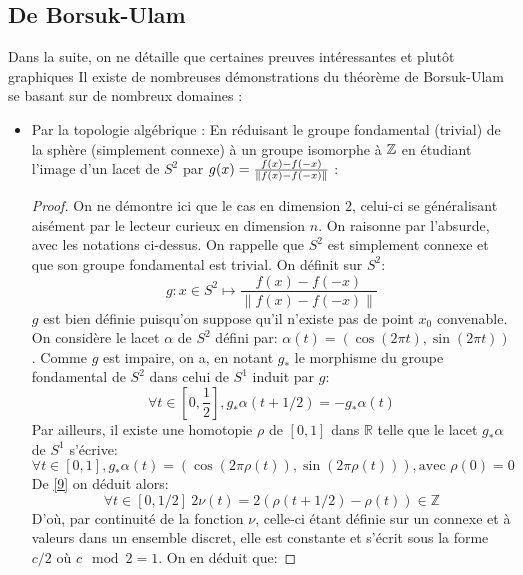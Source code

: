 \documentclass{cours}
\begin{document}
\subsection{De Borsuk-Ulam}
Dans la suite, on ne détaille que certaines preuves intéressantes et plutôt graphiques
Il existe de nombreuses démonstrations du théorème de Borsuk-Ulam se basant sur de nombreux domaines\! :
\begin{itemize}
    \item Par la topologie algébrique\! : En réduisant le groupe fondamental (trivial) de la sphère (simplement connexe) à un groupe isomorphe à $\mathbb{Z}$ en étudiant l'image d'un lacet de $S^{2}$ par $g(x) = \frac{f(x) - f(-x)}{\left\lVert f(x) - f(-x) \right\rVert}$\! :
          \begin{proof}
              On ne démontre ici que le cas en dimension $2$, celui-ci se généralisant aisément par le lecteur curieux en dimension $n$. On raisonne par l'absurde, avec les notations ci-dessus.
              On rappelle que $S^{2}$ est simplement connexe et que son groupe fondamental est trivial.
              On définit sur $S^{2}$:
              \[g: x \in S^{2} \mapsto \frac{f(x)-f(-x)}{\left\lVert f(x) - f(-x)\right\rVert}\]
              $g$ est bien définie puisqu'on suppose qu'il n'existe pas de point $x_{0}$ convenable. On considère le lacet $\alpha$ de $S^{2}$ défini par: $\alpha(t) = (\cos{(2\pi t)}, \sin{(2\pi t)})$.
              Comme $g$ est impaire, on a, en notant $g_{*}$ le morphisme du groupe fondamental de $S^{2}$ dans celui de $S^{1}$ induit par $g$:
              \begin{equation}
                  \label{9}
                  \forall t \in \left[0, \frac{1}{2}\right], g_{*}\alpha(t + 1/2) = -g_{*}\alpha(t)
              \end{equation}
              Par ailleurs, il existe une homotopie $\rho$ de $\left[0, 1\right]$ dans $\mathbb{R}$ telle que le lacet $g_{*}\alpha$ de $S^{1}$ s'écrive:
              \begin{equation*}
                  \forall t \in \left[0, 1\right], g_{*}\alpha(t) = (\cos{(2\pi \rho(t))}, \sin{(2\pi \rho(t))}), \text{avec } \rho(0) = 0
              \end{equation*}
              De \eqref{9} on déduit alors:
              \begin{equation*}
                  \forall t \in \left[0, 1/2\right] \ 2\nu(t) = 2(\rho(t + 1/2) - \rho(t)) \in \mathbb{Z}
              \end{equation*}
              D'où, par continuité de la fonction $\nu$, celle-ci étant définie sur un connexe et à valeurs dans un ensemble discret, elle est constante et s'écrit sous la forme $c/2$ où $c\mod 2 = 1$. On en déduit que:

\end{proof}
\end{itemize}
\end{document}
